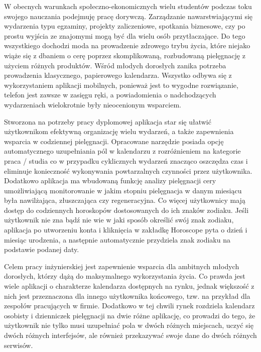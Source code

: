 \phantom{Th}
W obecnych warunkach społeczno-ekonomicznych wielu studentów podczas toku
swojego nauczania podejmuję pracę dorywczą. Zarządzanie nawarstwiającymi się wydarzenia
typu egzaminy, projekty zaliczeniowe, spotkania biznesowe, czy po prostu wyjścia ze
znajomymi mogą być dla wielu osób przytłaczające. Do tego wszystkiego dochodzi moda na
prowadzenie zdrowego trybu życia, które niejako wiąże się z dbaniem o cerę poprzez
skomplikowaną, rozbudowaną pielęgnację z użyciem różnych produktów. Wśród młodych
dorosłych zanika potrzeba prowadzenia klasycznego, papierowego kalendarza. Wszystko
odbywa się z wykorzystaniem aplikacji mobilnych, ponieważ jest to wygodne rozwiązanie,
telefon jest zawsze w zasięgu ręki, a powiadomienia o nadchodzących wydarzeniach
wielokrotnie były nieocenionym wsparciem.

Stworzona na potrzeby pracy dyplomowej aplikacja star się ułatwić użytkownikom
efektywną organizację wielu wydarzeń, a także zapewnienia wsparcia w codziennej pielęgnacji.
Opracowane narzędzie posiada opcję automatycznego uzupełniania pól w kalendarzu
z rozróżnieniem na kategorie praca / studia co w przypadku cyklicznych wydarzeń znacząco
oszczędza czas i eliminuje konieczność wykonywania powtarzalnych czynności przez
użytkownika. Dodatkowo aplikacja ma wbudowaną funkcję analizy pielęgnacji cery
umożliwiającą monitorowanie w jakim stopniu pielęgnacja w danym miesiącu była
nawilżająca, złuszczająca czy regeneracyjna. Co więcej użytkownicy mają dostęp do
codziennych horoskopów dostosowanych do ich znaków zodiaku. Jeśli użytkownik nie zna bądź
nie wie w jaki sposób określić swój znak zodiaku, aplikacja po utworzeniu konta i kliknięcia
w zakładkę Horoscope pyta o dzień i miesiąc urodzenia, a następnie automatycznie przydziela
znak zodiaku na podstawie podanej daty.

Celem pracy inżynierskiej jest zapewnienie wsparcia dla ambitnych młodych dorosłych,
którzy dążą do maksymalnego wykorzystania życia. Co prawda jest wiele aplikacji o charakterze
kalendarza dostępnych na rynku, jednak większość z nich jest przeznaczona dla innego
użytkownika końcowego, tzw. na przykład dla zespołów pracujących w firmie. Dodatkowo
w tej chwili rynek rozdziela kalendarz osobisty i dzienniczek pielęgnacji na dwie różne aplikację,
co prowadzi do tego, że użytkownik nie tylko musi uzupełniać pola w dwóch różnych miejscach,
uczyć się dwóch różnych interfejsów, ale również przekazywać swoje dane do dwóch różnych
serwisów.

